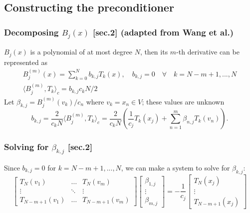 \documentclass{beamer}
\begin{document}
\subsection{Constructing the preconditioner}

\begin{frame}
\frametitle{Decomposing $B_j(x)$ [sec.2] (adapted from Wang et al.)}
$B_j(x)$ is a polynomial of at most degree $N$, then its $m$-th derivative can be represented as
\begin{equation*}
\begin{gathered}
 B^{(m)}_j(x) = \sum_{k=0}^N b_{k,j} T_k(x), \quad b_{k,j} = 0 \quad \forall \quad k=N-m+1,...,N \\
\langle B^{(m)}_j,T_k \rangle_c = b_{k,j} c_k N / 2
\end{gathered}
\end{equation*}
Let $\beta_{k,j} = B^{(m)}_j(v_k)/c_n$ where $v_k = x_n \in V$; these values are unknown
\begin{equation*}
b_{k,j} = \frac{2}{c_k N} \langle B_j^{(m)}, T_k \rangle_c = \frac{2}{c_k N} \left ( \frac{1}{c_j} T_k(x_j) + \sum_{n=1}^m \beta_{n,j} T_k(v_n) \right ).
\end{equation*}
\end{frame}

\begin{frame}
\frametitle{Solving for $\beta_{k,j}$ [sec.2]}
Since $b_{k,j} = 0$ for $k = N-m+1,...,N$, we can make a system to solve for $\beta_{k,j}$:
\begin{equation*}
\begin{bmatrix} T_N(v_1) & \dots & T_N(v_m) \\ \vdots & \ddots & \vdots \\ T_{N-m+1}(v_1) & \dots & T_{N-m+1}(v_m) \end{bmatrix}
\begin{bmatrix} \beta_{1,j} \\ \vdots \\ \beta_{m,j} \end{bmatrix} = 
- \frac{1}{c_j} \begin{bmatrix} T_N(x_j) \\ \vdots \\ T_{N-m+1}(x_j) \end{bmatrix}
\end{equation*}
\end{frame}
\end{document}
